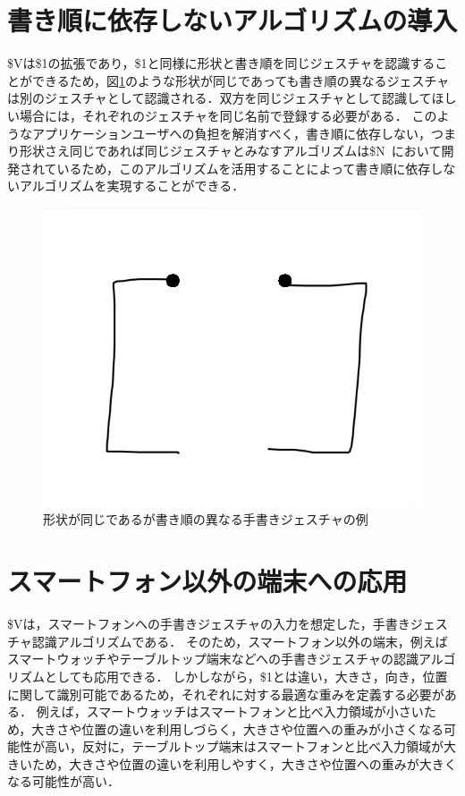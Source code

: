 \section{書き順に依存しないアルゴリズムの導入}
\$Vは\$1の拡張であり，\$1と同様に形状と書き順を同じジェスチャを認識することができるため，図\ref{fig:different_direction}のような形状が同じであっても書き順の異なるジェスチャは別のジェスチャとして認識される．双方を同じジェスチャとして認識してほしい場合には，それぞれのジェスチャを同じ名前で登録する必要がある．
このようなアプリケーションユーザへの負担を解消すべく，書き順に依存しない，つまり形状さえ同じであれば同じジェスチャとみなすアルゴリズムは\$N~\cite{}において開発されているため，このアルゴリズムを活用することによって書き順に依存しないアルゴリズムを実現することができる．

\begin{figure} [h!]
	\begin{center}
		\includegraphics [width=0.5\hsize ]{img/different_direction.eps}
	\end{center}
	\caption{形状が同じであるが書き順の異なる手書きジェスチャの例}
	\label{fig:different_direction}
\end{figure}


\section{スマートフォン以外の端末への応用}
\$Vは，スマートフォンへの手書きジェスチャの入力を想定した，手書きジェスチャ認識アルゴリズムである．
そのため，スマートフォン以外の端末，例えばスマートウォッチやテーブルトップ端末などへの手書きジェスチャの認識アルゴリズムとしても応用できる．
しかしながら，\$1とは違い，大きさ，向き，位置に関して識別可能であるため，それぞれに対する最適な重みを定義する必要がある．
例えば，スマートウォッチはスマートフォンと比べ入力領域が小さいため，大きさや位置の違いを利用しづらく，大きさや位置への重みが小さくなる可能性が高い，反対に，テーブルトップ端末はスマートフォンと比べ入力領域が大きいため，大きさや位置の違いを利用しやすく，大きさや位置への重みが大きくなる可能性が高い．

